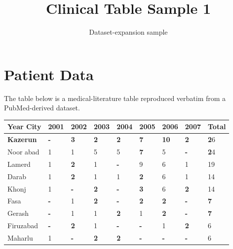 \documentclass[11pt]{article}
\title{Clinical Table Sample 1}
\author{Dataset-expansion sample}
\date{}
\begin{document}
\maketitle
\section{Patient Data}
The table below is a medical-literature table reproduced verbatim from a PubMed-derived dataset.

\begin{table}
\begin{tabular}{|l|l|l|l|l|l|l|l|l|}
\hline
\textbf{Year City} & \textbf{\textbf{\textbf{\textbf{2}}}001} & \textbf{\textbf{\textbf{\textbf{2}}}00\textbf{\textbf{\textbf{2}}}} & \textbf{\textbf{\textbf{\textbf{2}}}00\textbf{3}} & \textbf{\textbf{\textbf{\textbf{2}}}004} & \textbf{\textbf{\textbf{\textbf{2}}}005} & \textbf{\textbf{\textbf{\textbf{2}}}006} & \textbf{\textbf{\textbf{\textbf{2}}}00\textbf{7}} & \textbf{Total} \\
\hline
\textbf{Kazerun} & \textbf{-} & \textbf{3} & \textbf{\textbf{\textbf{2}}} & \textbf{\textbf{\textbf{2}}} & \textbf{7} & \textbf{10} & \textbf{\textbf{\textbf{2}}} & \textbf{\textbf{\textbf{2}}}6 \\
\hline
Noor abad & 1 & 1 & 5 & 5 & \textbf{7} & 5 & \textbf{-} & \textbf{\textbf{\textbf{2}}}4 \\
\hline
Lamerd & 1 & \textbf{\textbf{\textbf{2}}} & 1 & \textbf{-} & 9 & 6 & 1 & 19 \\
\hline
Darab & 1 & \textbf{\textbf{\textbf{2}}} & 1 & 1 & \textbf{\textbf{\textbf{2}}} & 6 & 1 & 14 \\
\hline
Khonj & 1 & \textbf{-} & \textbf{\textbf{\textbf{2}}} & \textbf{-} & \textbf{3} & 6 & \textbf{\textbf{\textbf{2}}} & 14 \\
\hline
Fasa & \textbf{-} & 1 & \textbf{\textbf{\textbf{2}}} & \textbf{-} & \textbf{\textbf{\textbf{2}}} & \textbf{\textbf{\textbf{2}}} & \textbf{-} & \textbf{7} \\
\hline
Gerash & \textbf{-} & 1 & 1 & \textbf{\textbf{\textbf{2}}} & 1 & \textbf{\textbf{\textbf{2}}} & \textbf{-} & \textbf{7} \\
\hline
Firuzabad & \textbf{-} & \textbf{\textbf{\textbf{2}}} & 1 & \textbf{-} & \textbf{-} & 1 & \textbf{\textbf{\textbf{2}}} & 6 \\
\hline
Maharlu & 1 & \textbf{-} & \textbf{\textbf{\textbf{2}}} & \textbf{\textbf{\textbf{2}}} & \textbf{-} & \textbf{-} & \textbf{-} & 6 \\

\end{tabular}
\end{table}
\end{document}
